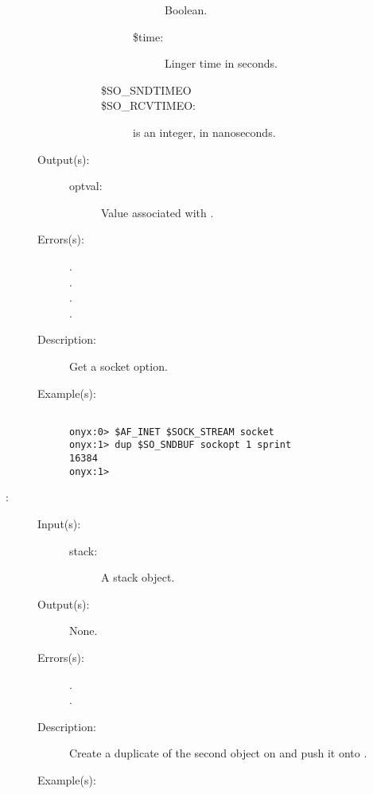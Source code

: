 \begin{description}
\begin{description}
\begin{description}
\begin{description}
\begin{description}
					Boolean.
				\item[\$time: ]
					Linger time in seconds.
				\end{description}
			\item[\$SO\_SNDTIMEO]
			\item[\$SO\_RCVTIMEO: ]
				 is an integer, in nanoseconds.
			\end{description}
		\end{description}
	\item[Output(s): ]
		\begin{description}\item[]
		\item[optval: ]
			Value associated with .
		\end{description}
	\item[Errors(s): ]
		\begin{description}\item[]
		\item[.]
		\item[.]
		\item[.]
		\item[.]
		\end{description}
	\item[Description: ]
		Get a socket option.
	\item[Example(s): ]\begin{verbatim}

onyx:0> $AF_INET $SOCK_STREAM socket
onyx:1> dup $SO_SNDBUF sockopt 1 sprint
16384
onyx:1>
		\end{verbatim}
	\end{description}
\label{systemdict:sover}
\item[{\onyxop{stack}{sover}{--}}: ]
	\begin{description}\item[]
	\item[Input(s): ]
		\begin{description}\item[]
		\item[stack: ]
			A stack object.
		\end{description}
	\item[Output(s): ] None.
	\item[Errors(s): ]
		\begin{description}\item[]
		\item[.]
		\item[.]
		\end{description}
	\item[Description: ]
		Create a duplicate of the second object on  and
		push it onto .
	\item[Example(s): ]\begin{verbatim}


\end{verbatim}
\end{description}
\end{description}
